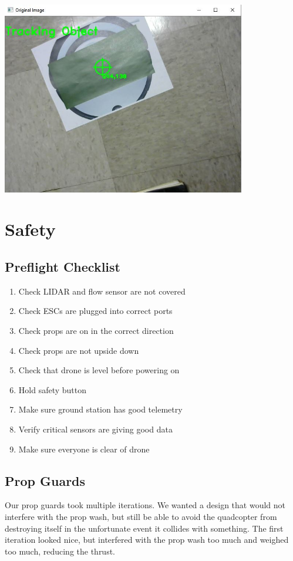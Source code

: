 \documentclass[12pt]{article}
\begin{document}
\begin{center}
\includegraphics[width=0.8\textwidth]{tracking}
\end{center}

\section{Safety}
\subsection{Preflight Checklist}
\begin{enumerate}
	\item Check LIDAR and flow sensor are not covered 
	\item Check ESCs are plugged into correct ports 
	\item Check props are on in the correct direction 
	\item Check props are not upside down
	\item Check that drone is level before powering on
	\item Hold safety button
	\item Make sure ground station has good telemetry
	\item Verify critical sensors are giving good data
	\item Make sure everyone is clear of drone 
\end{enumerate}


\subsection{Prop Guards}
Our prop guards took multiple iterations. We wanted a design that would not interfere with the prop wash, but still be able to avoid the quadcopter from destroying itself in the unfortunate event it collides with something. The first iteration looked nice, but interfered with the prop wash too much and weighed too much, reducing the thrust. 
\end{document}
